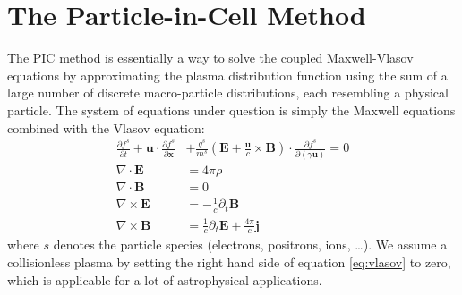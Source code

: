 \section{The Particle-in-Cell Method}
\label{sec:particle-cell-method}
The PIC method is essentially a way to solve the coupled Maxwell-Vlasov
equations by approximating the plasma distribution function using the sum of a
large number of discrete macro-particle distributions, each resembling a
physical particle. The system of equations under question is simply the Maxwell
equations combined with the Vlasov equation:
\begin{align}
  \frac{\partial f^{s}}{\partial t} + \mathbf{u}\cdot\frac{\partial f^s}{\partial \mathbf{x}} &+ \frac{q^s}{m^s}\left(\mathbf{E} + \frac{\mathbf{u}}{c}\times \mathbf{B}\right)\cdot\frac{\partial f^s}{\partial (\gamma \mathbf{u})} = 0 \label{eq:vlasov}\\
  \nabla\cdot \mathbf{E} &= 4\pi\rho \\
  \nabla\cdot \mathbf{B} &= 0 \\
  \nabla\times \mathbf{E} &= -\frac{1}{c}\partial_t \mathbf{B} \\
  \nabla\times \mathbf{B} &= \frac{1}{c}\partial_t \mathbf{E} + \frac{4\pi}{c} \mathbf{j}
\end{align}
where $s$ denotes the particle species (electrons, positrons, ions,
\dots). We assume a collisionless plasma by setting the right hand
side of equation \eqref{eq:vlasov} to zero, which is applicable for a lot of
astrophysical applications.

